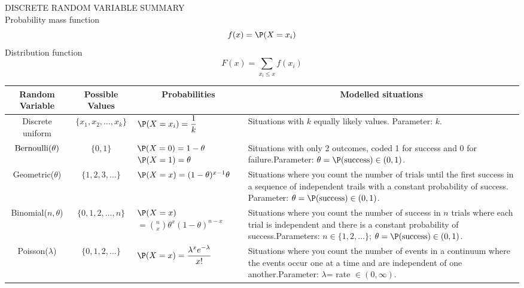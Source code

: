 DISCRETE RANDOM VARIABLE SUMMARY\\

Probability mass function $$f(x)=\P(X=x_i)$$
Distribution function $$F(x)=\sum_{x_i\leq x}f(x_i)$$

\begin{center}
{\renewcommand{\arraystretch}{1.5}
\begin{tabular}{|c|c|p{3.2cm}|p{6.2cm}|}
\multicolumn{1}{c}{\bf Random  Variable} & \multicolumn{1}{c}{\bf Possible  Values}
&\multicolumn{1}{c}{\bf Probabilities} &\multicolumn{1}{c}{\bf Modelled situations} \\\hline
Discrete  uniform&$\{x_1,x_2,\dots,x_k\}$&$\P(X=x_i)=\displaystyle\frac{1}{k}$&Situations with $k$ equally likely values.  Parameter: $k$.\\\hline
$\mbox{{\rm Bernoulli}}(\theta)$&$\{0,1\}$&$\P(X=0)=1-\theta$\newline$\P(X=1)=\theta$&Situations with only 2 outcomes, coded 1 for success and 0 for failure.\newline Parameter: $\theta=\P(\textrm{success}) \in (0, 1)$.\\\hline
Geometric($\theta$)&$\{1,2,3,\dots\}$&$\P(X=x)\newline=(1-\theta)^{x-1}\theta$& Situations where you count the number of trials until the first success in a sequence of independent trails with a constant probability of success. \newline Parameter: $\theta=\P(\textrm{success}) \in (0, 1)$.\\\hline
Binomial($n,\theta$)&$\{0,1,2,\dots,n\}$&$\P(X=x)$\newline $=\displaystyle\binom{n}{x}\theta^x(1-\theta)^{n-x}$&Situations where you count the number of success in $n$ trials where each trial is independent and there is a constant probability of success.\newline Parameters: $n \in \{1,2,\ldots\}$; $\theta=\P(\textrm{success}) \in (0, 1)$.\\\hline
Poisson($\lambda$)&$\{0,1,2,\dots\}$&$\P(X=x)\newline=\displaystyle \frac{\lambda^xe^{-\lambda}}{x!}$&Situations where you count the number of events in a continuum where the events occur one at a time and are independent of one another.\newline Parameter: $\lambda$= rate $\in (0,\infty)$.\\\hline
\end{tabular}}
\end{center}

